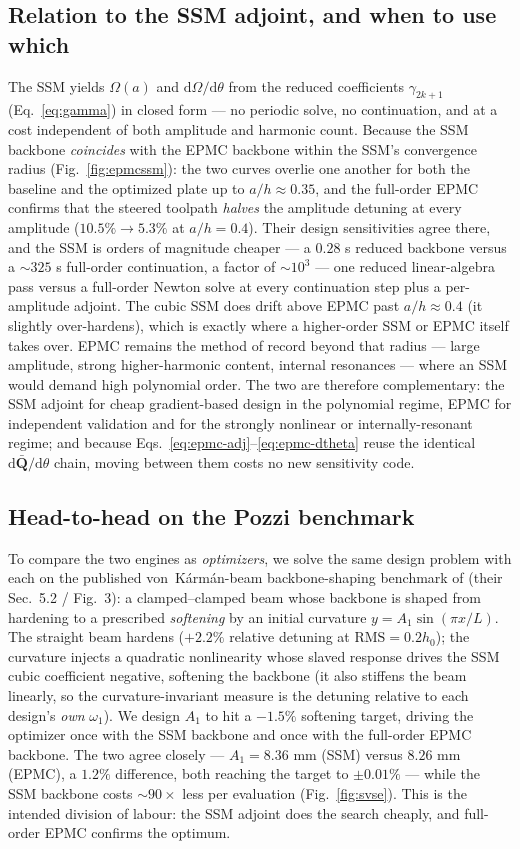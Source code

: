\documentclass[11pt]{article}
\newcommand{\dd}{\mathrm{d}}
\begin{document}
\subsection{Relation to the SSM adjoint, and when to use which}
The SSM yields $\Omega(a)$ and $\dd\Omega/\dd\theta$ from the reduced coefficients
$\gamma_{2k+1}$ (Eq.~\eqref{eq:gamma}) in closed form --- no periodic solve, no
continuation, and at a cost independent of both amplitude and harmonic count. Because
the SSM backbone \emph{coincides} with the EPMC backbone within the SSM's convergence
radius (Fig.~\ref{fig:epmcssm}): the two curves overlie one another for both the
baseline and the optimized plate up to $a/h\!\approx\!0.35$, and the full-order EPMC
confirms that the steered toolpath \emph{halves} the amplitude detuning at every
amplitude ($10.5\%\!\to\!5.3\%$ at $a/h\!=\!0.4$). Their design sensitivities agree
there, and the SSM is orders of magnitude cheaper --- a $0.28$ s reduced backbone
versus a $\sim\!325$ s full-order continuation, a factor of $\sim\!10^{3}$ --- one
reduced linear-algebra pass versus a full-order Newton solve at every continuation
step plus a per-amplitude adjoint. The cubic SSM does drift above EPMC past
$a/h\!\approx\!0.4$ (it slightly over-hardens), which is exactly where a higher-order
SSM or EPMC itself takes over. EPMC
remains the method of record beyond that radius --- large amplitude, strong
higher-harmonic content, internal resonances --- where an SSM would demand high
polynomial order. The two are therefore complementary: the SSM adjoint for cheap
gradient-based design in the polynomial regime, EPMC for independent validation and
for the strongly nonlinear or internally-resonant regime; and because
Eqs.~\eqref{eq:epmc-adj}--\eqref{eq:epmc-dtheta} reuse the identical
$\dd\bar{\bm Q}/\dd\theta$ chain, moving between them costs no new sensitivity code.

\subsection{Head-to-head on the Pozzi benchmark}
To compare the two engines as \emph{optimizers}, we solve the same design problem
with each on the published von~K\'arm\'an-beam backbone-shaping benchmark of
\cite{pozzi2025} (their Sec.~5.2 / Fig.~3): a clamped--clamped beam whose backbone
is shaped from hardening to a prescribed \emph{softening} by an initial curvature
$y=A_1\sin(\pi x/L)$. The straight beam hardens ($+2.2\%$ relative detuning at
$\mathrm{RMS}=0.2h_0$); the curvature injects a quadratic nonlinearity whose slaved
response drives the SSM cubic coefficient negative, softening the backbone (it also
stiffens the beam linearly, so the curvature-invariant measure is the detuning
relative to each design's \emph{own} $\omega_1$). We design $A_1$ to hit a $-1.5\%$
softening target, driving the optimizer once with the SSM backbone and once with the
full-order EPMC backbone. The two agree closely --- $A_1=8.36$ mm (SSM) versus
$8.26$ mm (EPMC), a $1.2\%$ difference, both reaching the target to $\pm0.01\%$ ---
while the SSM backbone costs $\sim\!90\times$ less per evaluation
(Fig.~\ref{fig:svse}). This is the intended division of labour: the SSM adjoint does
the search cheaply, and full-order EPMC confirms the optimum.
\end{document}
